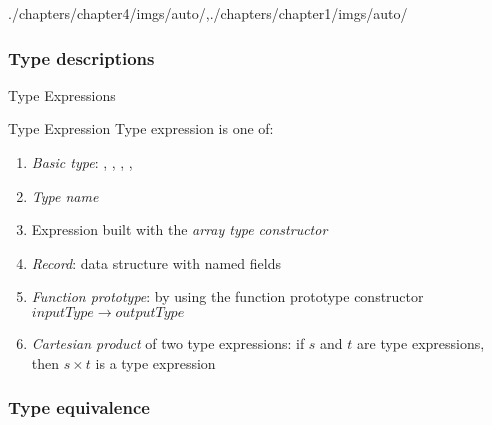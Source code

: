\begin{graphicspathcontext}{{./chapters/chapter4/imgs/auto/},{./chapters/chapter1/imgs/auto/}}
\begin{bibunit}[apalike]
\subsubsection{Type descriptions}
\subsubsectiontableofcontentslide

\begin{frame}{Type Expressions}
	\vspace{.25cm}
	\begin{definitionblock}{Type Expression}
		Type expression is one of:
		\begin{enumerate}
		\item \emph{Basic type}: , , , , 
		\item \emph{Type name}
		\item Expression built with the \emph{array type constructor}
		\item \emph{Record}: data structure with named fields
		\item \emph{Function prototype}: by using the function prototype constructor $inputType \rightarrow outputType$
		\item \emph{Cartesian product} of two type expressions: if $s$ and $t$ are type expressions, then $s \times t$ is a type expression
		\end{enumerate}
	\end{definitionblock}
\end{frame}

\subsubsection{Type equivalence}
\subsubsectiontableofcontentslide


\end{bibunit}
\end{graphicspathcontext}
